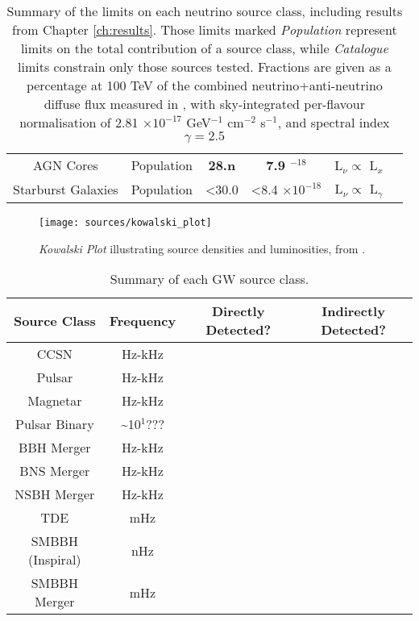 \begin{table*}[]
\begin{tabular}{|c c c c c c|}
		AGN Cores & Population & \textbf{28.n} &\textbf{7.9 \times 10$^{-18}$}& L$_{\nu} \propto$ L$_{x}$&\cite{federica_thesis}\\
		Starburst Galaxies & Population &<30.0& <8.4 $\times 10^{-18}$ & L$_{\nu} \propto$ L$_{\gamma}$&\cite{bechtol_sbg_17}\\
		\hline
	\end{tabular}
	\caption{Summary of the limits on each neutrino source class, including results from Chapter \ref{ch:results}. Those limits marked \emph{Population} represent limits on the total contribution of a source class, while \emph{Catalogue} limits constrain only those sources tested. Fractions are given as a percentage  at 100 TeV of the combined neutrino+anti-neutrino diffuse flux measured in \cite{ic_global_fit_15}, with sky-integrated per-flavour normalisation of 2.81 $\times 10^{-17}$ GeV$^{-1}$ cm$^{-2}$ s$^{-1}$, and spectral index $\gamma=2.5$}
	\label{tab:source_limits}
\end{table*}{}

\begin{figure}[!ht]
	\centering \texttt{[image: sources/kowalski\_plot]}
	\caption{\emph{Kowalski Plot} illustrating source densities and luminosities, from \cite{ic_gen2_21}.}
	\label{fig:kowalski_plot}
\end{figure}

\begin{table*}[]
	\centering
	\begin{tabular}{| c c c c |} 
		\hline
		Source Class & Frequency & Directly Detected? & Indirectly Detected? \\ 
		\hline
		CCSN &Hz-kHz&\xmark&\xmark\\
		Pulsar &Hz-kHz &\xmark&\xmark\\
		Magnetar & Hz-kHz &\xmark&\xmark\\
		Pulsar Binary &\sim10$^{1}$???&\xmark&\textcolor{ForestGreen}{\cmark}\\
		BBH Merger &Hz-kHz&\textcolor{ForestGreen}{\cmark}&\xmark\\
		BNS Merger &Hz-kHz&\textcolor{ForestGreen}{\cmark}&\xmark\\
		NSBH Merger &Hz-kHz&\textcolor{ForestGreen}{\cmark}&\xmark\\
		TDE&mHz&\xmark&\xmark\\
		SMBBH (Inspiral) & nHz &\xmark&\xmark\\
		SMBBH Merger & mHz &\xmark&\xmark\\
		\hline
	\end{tabular}
	\caption{Summary of each GW source class.}
	\label{tab:gw_source_table}
\end{table*}{}